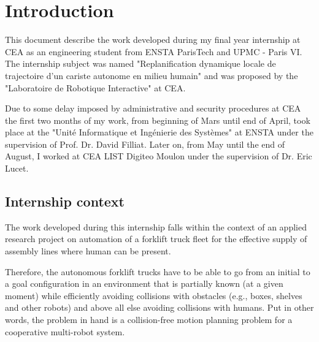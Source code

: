 
\let\savecleardoublepage\cleardoublepage
\let\cleardoublepage\clearpage
\chapter{Introduction}

This document describe the work developed during my final year internship at CEA
as an engineering student from ENSTA ParisTech and UPMC - Paris VI.
The internship subject was named "Replanification dynamique locale de trajectoire d’un cariste autonome en milieu humain" and was proposed by the "Laboratoire de Robotique Interactive" at CEA.

Due to some delay imposed by administrative and security procedures at CEA 
the first two months of my work,
from beginning of Mars until end of April, took place at the "Unité Informatique et Ingénierie des Systèmes" at ENSTA under the supervision of Prof. Dr. David Filliat.
Later on, from May until the end of August, I worked at CEA LIST Digiteo Moulon under the
supervision of Dr. Eric Lucet.


\section{Internship context}


The work developed during this internship falls within the context of an applied research project on 
automation of a forklift truck fleet for the effective supply of assembly lines where human can be present.

Therefore, the autonomous forklift trucks
have to be able to go from an initial to a goal configuration in an environment that is partially known (at a given moment) while efficiently 
avoiding collisions with obstacles (e.g., boxes, shelves and other robots) and above all else avoiding collisions with humans. Put in other words, the problem in hand is a collision-free motion planning problem for a cooperative multi-robot system.

